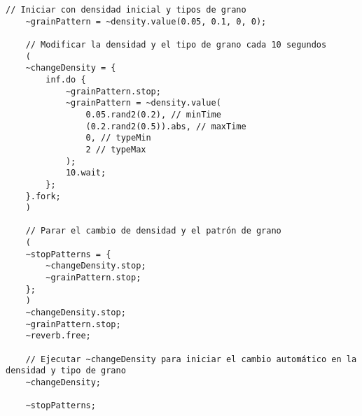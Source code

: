 \begin{minipage}[t]{1\textwidth}
\begin{lstlisting}[style=SuperCollider-IDE, basicstyle=\footnotesize\ttfamily, numbers=none]
    // Iniciar con densidad inicial y tipos de grano
    ~grainPattern = ~density.value(0.05, 0.1, 0, 0);
    
    // Modificar la densidad y el tipo de grano cada 10 segundos
    (
    ~changeDensity = {
        inf.do {
            ~grainPattern.stop;
            ~grainPattern = ~density.value(
                0.05.rand2(0.2), // minTime
                (0.2.rand2(0.5)).abs, // maxTime
                0, // typeMin
                2 // typeMax
            );
            10.wait;
        };
    }.fork;
    )
    
    // Parar el cambio de densidad y el patrón de grano
    (
    ~stopPatterns = {
        ~changeDensity.stop;
        ~grainPattern.stop;
    };
    )
    ~changeDensity.stop;
    ~grainPattern.stop;
    ~reverb.free;
    
    // Ejecutar ~changeDensity para iniciar el cambio automático en la densidad y tipo de grano
    ~changeDensity;
    
    ~stopPatterns;
    \end{lstlisting}
    \vspace{1cm}
\end{minipage}
